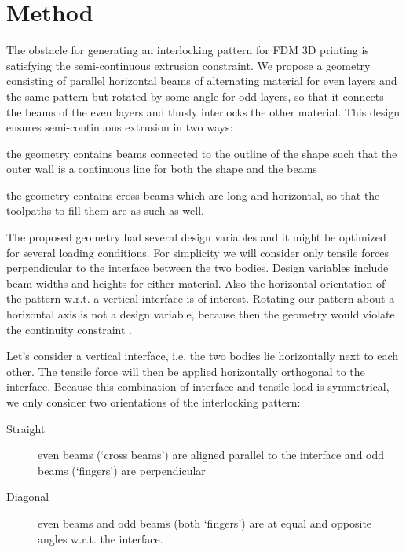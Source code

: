 \section{Method}

The obstacle for generating an interlocking pattern for FDM 3D printing is satisfying the semi-continuous extrusion constraint.
We propose a geometry consisting of parallel horizontal beams of alternating material for even layers and the same pattern but rotated by some angle for odd layers, 
so that it connects the beams of the even layers and thusly interlocks the other material.
This design ensures semi-continuous extrusion in two ways:
\begin{itemize*}
	\item the geometry contains beams connected to the outline of the shape such that the outer wall is a continuous line for both the shape and the beams
	\item the geometry contains cross beams which are long and horizontal, so that the toolpaths to fill them are as such as well.
\end{itemize*}



The proposed geometry had several design variables and it might be optimized for several loading conditions.
For simplicity we will consider only tensile forces perpendicular to the interface between the two bodies.
Design variables include beam widths and heights for either material.
Also the horizontal orientation of the pattern w.r.t. a vertical interface is of interest.
Rotating our pattern about a horizontal axis is not a design variable, because then the geometry would violate the continuity constraint .

Let's consider a vertical interface, 
i.e. the two bodies lie horizontally next to each other.
The tensile force will then be applied horizontally orthogonal to the interface.
Because this combination of interface and tensile load is symmetrical, 
we only consider two orientations of the interlocking pattern:
\begin{description}
	\item[Straight] even beams (`cross beams') are aligned parallel to the interface and odd beams (`fingers') are perpendicular
	\item[Diagonal] even beams and odd beams (both `fingers') are at equal and opposite angles w.r.t. the interface.
\end{description}






